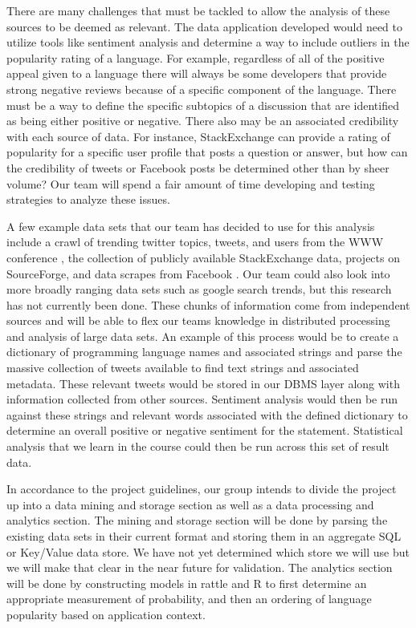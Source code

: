 \documentclass{sig-alternate}
\begin{document}
There are many challenges that must be tackled to allow the analysis of these sources to be deemed as relevant. The data application developed would need to utilize tools like sentiment analysis and determine a way to include outliers in the popularity rating of a language. For example, regardless of all of the positive appeal given to a language there will always be some developers that provide strong negative reviews because of a specific component of the language. There must be a way to define the specific subtopics of a discussion that are identified as being either positive or negative. There also may be an associated credibility with each source of data. For instance, StackExchange can provide a rating of popularity for a specific user profile that posts a question or answer, but how can the credibility of tweets or Facebook posts be determined other than by sheer volume? Our team will spend a fair amount of time developing and testing strategies to analyze these issues. 

A few example data sets that our team has decided to use for this analysis include a crawl of trending twitter topics, tweets, and users from the WWW conference \cite{Kwak10www}, the collection of publicly available StackExchange data, projects on SourceForge, and data scrapes from Facebook \cite{FBCrawl}. Our team could also look into more broadly ranging data sets such as google search trends, but this research has not currently been done.  These chunks of information come from independent sources and will be able to flex our team\textsc{}s knowledge in distributed processing and analysis of large data sets. An example of this process would be to create a dictionary of programming language names and associated strings and parse the massive collection of tweets available to find text strings and associated metadata. These relevant tweets would be stored in our DBMS layer along with information collected from other sources. Sentiment analysis would then be run against these strings and relevant words associated with the defined dictionary to determine an overall positive or negative sentiment for the statement. Statistical analysis that we learn in the course could then be run across this set of result data. 

In accordance to the project guidelines, our group intends to divide the project up into a data mining and storage section as well as a data processing and analytics section. The mining and storage section will be done by parsing the existing data sets in their current format and storing them in an aggregate SQL or Key/Value data store. We have not yet determined which store we will use but we will make that clear in the near future for validation. The analytics section will be done by constructing models in rattle and R to first determine an appropriate measurement of probability, and then an ordering of language popularity based on application context.
\end{document}
